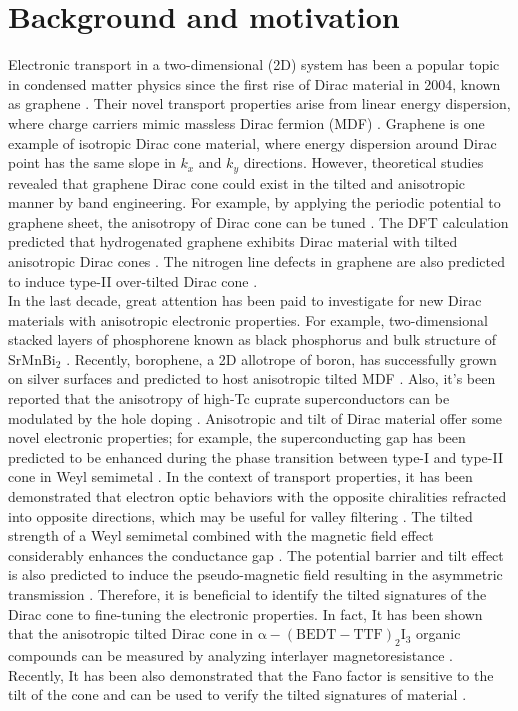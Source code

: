 \section{Background and motivation}
    Electronic transport in a two-dimensional (2D) system has been a popular topic in condensed matter physics since the first rise of Dirac material in 2004, known as graphene \cite{Zhang2004,Wehling2014}. 
    Their novel transport properties arise from linear energy dispersion, where charge carriers mimic massless Dirac fermion (MDF) \cite{CastroNeto2009}. 
    Graphene is one example of isotropic Dirac cone material, where energy dispersion around Dirac point has the same slope in $k_x$ and $k_y$ directions. 
    However, theoretical studies revealed that graphene Dirac cone could exist in the tilted and anisotropic manner by band engineering. 
    For example, by applying the periodic potential to graphene sheet, the anisotropy of Dirac cone can be tuned \cite{Park2008}. 
    The DFT calculation predicted that hydrogenated graphene exhibits Dirac material with tilted anisotropic Dirac cones \cite{Lu2016}. 
    The nitrogen line defects in graphene are also predicted to induce type-II over-tilted Dirac cone \cite{Zhang2017a}.\\

    In the last decade, great attention has been paid to investigate for new Dirac materials with anisotropic electronic properties. 
    For example, two-dimensional stacked layers of phosphorene known as black phosphorus \cite{Xia2014,Kim2015} and bulk structure of $\mathrm{SrMnBi_2}$ \cite{Park2011}. 
    Recently, borophene, a 2D allotrope of boron, has successfully grown on silver surfaces and predicted to host anisotropic tilted MDF \cite{Mannix2015,Zhou2014}. 
    Also, it’s been reported that the anisotropy of high-Tc cuprate superconductors can be modulated by the hole doping \cite{Marino2019}.
    Anisotropic and tilt of Dirac material offer some novel electronic properties; for example, the superconducting gap has been predicted to be enhanced during the phase transition between type-I and type-II cone in Weyl semimetal \cite{Li2017a}. 
    In the context of transport properties, it has been demonstrated that electron optic behaviors with the opposite chiralities refracted into opposite directions, which may be useful for valley filtering \cite{Nguyen2018a}. 
    The tilted strength of a Weyl semimetal combined with the magnetic field effect considerably enhances the conductance gap \cite{Yesilyurt2017}. 
    The potential barrier and tilt effect is also predicted to induce the pseudo-magnetic field resulting in the asymmetric transmission \cite{Yesilyurt2017a}. 
    Therefore, it is beneficial to identify the tilted signatures of the Dirac cone to fine-tuning the electronic properties. 
    In fact, It has been shown that the anisotropic tilted Dirac cone in $\mathrm{\alpha-(BEDT-TTF)_2I_3}$ organic compounds can be measured by analyzing interlayer magnetoresistance \cite{Morinari2009}. 
    Recently, It has been also demonstrated that the Fano factor is sensitive to the tilt of the cone and can be used to verify the tilted signatures of material \cite{Trescher2015}.\\

